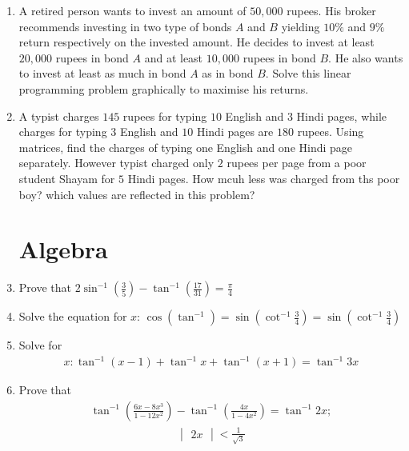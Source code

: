 \documentclass[12pt,-letter paper]{article}
\newcommand{\mydet}[1]{\ensuremath{\begin{vmatrix}#1\end{vmatrix}}}
\providecommand{\brak}[1]{\ensuremath{\left(#1\right)}}
\providecommand{\brak}[1]{\ensuremath{\left(#1\right)}}
\begin{document}
\begin{enumerate}
 
 	\item  A retired person wants to invest an amount of $50,000$ rupees. His broker recommends investing in two type of bonds $A$ and $B$ yielding $10\%$ and $9\%$ return respectively on the invested amount. He decides to invest at least
$20,000$ rupees in bond $A$ and at least $10,000$ rupees in bond $B$. He also wants to invest at least as much in bond $A$ as in bond $B$. Solve this linear programming problem graphically to maximise his returns.

	\item A typist charges $145$ rupees for typing $10$ English and $3$ Hindi pages, while charges for typing $3$ English and $10$ Hindi pages are $180$ rupees. Using matrices, 
find the charges of typing one English and one Hindi page separately. 
However typist charged only $2$ rupees per page from a poor student Shayam for $5$ Hindi pages.
How mcuh less was charged from ths poor boy? which values are reflected in this problem?

	

\section{Algebra}
	\item Prove that $ 2\sin^{-1} \brak{\frac{3}{5}} - \tan^{-1} \brak{\frac{17}{31}} = \frac{\pi}{4}$

	\item Solve the equation for $x$: $\cos (\tan^{-1}) = \sin \brak{\cot^{-1} \frac{3}{4}} = \sin \brak{\cot^{-1} \frac{3}{4}}$

	
	\item Solve for 
	\begin{align*}
		x: \tan^{-1}(x-1) + \tan^{-1}x + \tan^{-1}(x+1) = \tan^{-1}3x
	\end{align*}

	\item Prove that 
	\begin{align*}
	\tan^{-1} \brak{\frac{6x-8x^{3}}{1-12x^{2}}} - \tan^{-1} \brak{\frac{4x}{1-4x^{2}}} = \tan^{-1}2x;
	\end{align*}
	\begin{align*}
		\mydet{2x} < \frac{1}{\sqrt{3}}
	\end{align*}

	
\end{enumerate}
\end{document}

